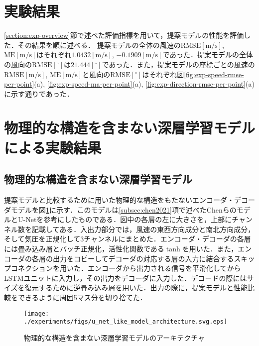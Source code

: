 \section{実験結果 \label{section:exp-results}}
\ref{section:exp-overview}節で述べた評価指標を用いて，提案モデルの性能を評価した．その結果を順に述べる．
提案モデルの全体の風速の$\mathrm{RMSE[m/s]}$, $\mathrm{ME[m/s]}$はそれぞれ$1.0432\mathrm{[m/s]}$, $-0.1909\mathrm{[m/s]}$であった．提案モデルの全体の風向の$\mathrm{RMSE[^\circ]}$は$21.444\mathrm{[^\circ]}$であった．また，提案モデルの座標ごとの風速の$\mathrm{RMSE[m/s]}$, $\mathrm{ME[m/s]}$と風向の$\mathrm{RMSE[^\circ]}$はそれぞれ図\ref{fig:exp-speed-rmse-per-point}(a), \ref{fig:exp-speed-ma-per-point}(a), \ref{fig:exp-direction-rmse-per-point}(a)に示す通りであった．

\section{物理的な構造を含まない深層学習モデルによる実験結果 \label{section:exp-results-without-physicial-structure}}

\subsection{物理的な構造を含まない深層学習モデル \label{subsection:exp-encoder-decoder-model}}
提案モデルと比較するために用いた物理的な構造をもたないエンコーダ・デコーダモデルを図\ref{fig:exp-encoder-decoder-model}に示す．このモデルは\ref{subsec:chen2021}項で述べたChenらのモデルとU-Net\cite{journals/corr/RonnebergerFB15}を参考にしたものである．図中の各層の左に大きさを，上部にチャンネル数を記載してある．入出力部分では，風速の東西方向成分と南北方向成分，そして気圧を正規化して3チャンネルにまとめた．エンコーダ・デコーダの各層には畳み込み層とバッチ正規化\cite{10.5555/3045118.3045167}，活性化関数である$\tanh$を用いた．また，エンコーダの各層の出力をコピーしてデコーダの対応する層の入力に結合するスキップコネクションを用いた．エンコーダから出力される信号を平滑化してからLSTMユニットに入力し，その出力をデコーダに入力した．デコードの際にはサイズを復元するために逆畳み込み層を用いた．出力の際に，提案モデルと性能比較をできるように周囲5マス分を切り捨てた．

\begin{figure}[bp]
  \centering
  \texttt{[image: ./experiments/figs/u\_net\_like\_model\_architecture.svg.eps]}
  \caption{物理的な構造を含まない深層学習モデルのアーキテクチャ}
  \label{fig:exp-encoder-decoder-model}
\end{figure}

